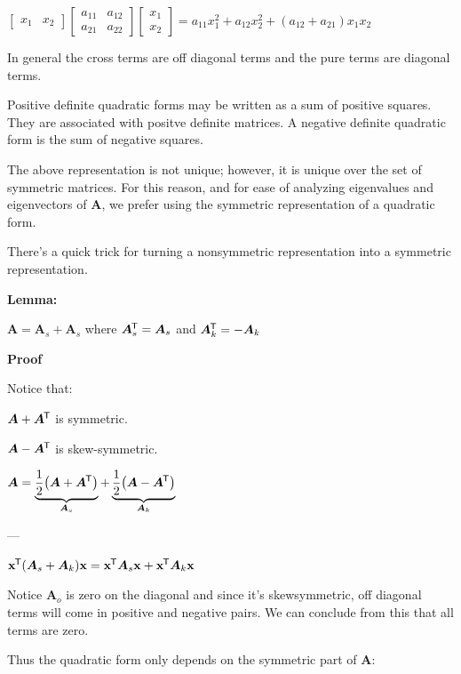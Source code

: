 \documentclass[11pt]{article}
\begin{document}
  \(\begin{bmatrix}
    x_1 & x_2
  \end{bmatrix}
  \begin{bmatrix}
    a_{11} & a_{12}  \\
    a_{21} & a_{22}
  \end{bmatrix}
  \begin{bmatrix}
    x_1 \\ x_2
  \end{bmatrix} = a_{11}x_1^2 + a_{12}x_2^2 + (a_{12} + a_{21})x_1x_2\)

  In general the cross terms are off diagonal terms and the pure terms are diagonal terms.

  \vspace{12pt}

  Positive definite quadratic forms may be written as a sum of positive squares. They are associated with positve
  definite matrices. A negative definite quadratic form is the sum of negative squares.

  The above representation is not unique; however, it is unique over the set of symmetric matrices.
  For this reason, and for ease of analyzing eigenvalues and eigenvectors of \(\bm{A}\), we prefer
  using the symmetric representation of a quadratic form.

  There's a quick trick for turning a nonsymmetric representation into a symmetric representation.

  \textbf{Lemma:}

  \(\bm{A} = \bm{A}_s + \bm{A}_s\) where \(\bm{A}_s^{\mkern-1.5mu\mathsf{T}} = \bm{A}_s\) and \(\bm{A}_k^{\mkern-1.5mu\mathsf{T}} = -\bm{A}_k\)

  \textbf{Proof}

  Notice that:

  \(\bm{A} + \bm{A}^{\mkern-1.5mu\mathsf{T}}\) is symmetric.

  \(\bm{A} - \bm{A}^{\mkern-1.5mu\mathsf{T}}\) is skew-symmetric.

  \(\bm{A} = \underbrace{\frac{1}{2}{\left( \bm{A} + \bm{A}^{\mkern-1.5mu\mathsf{T}} \right)}}_{\bm{A}_s} +
  \underbrace{\frac{1}{2}{\left( \bm{A} - \bm{A}^{\mkern-1.5mu\mathsf{T}} \right)}}_{\bm{A}_k}\)

  ---

  \(\mathbf{x}^{\mkern-1.5mu\mathsf{T}} (\bm{A}_s + \bm{A}_k) \mathbf{x} = \mathbf{x}^{\mkern-1.5mu\mathsf{T}} \bm{A}_s\mathbf{x} + \mathbf{x}^{\mkern-1.5mu\mathsf{T}}\bm{A}_k \mathbf{x}\)

  Notice \(\bm{A}_o\) is zero on the diagonal and since it's skewsymmetric, off diagonal terms
  will come in positive and negative pairs. We can conclude from this that all terms are zero.

  Thus the quadratic form only depends on the symmetric part of \(\bm{A}\):
\end{document}
